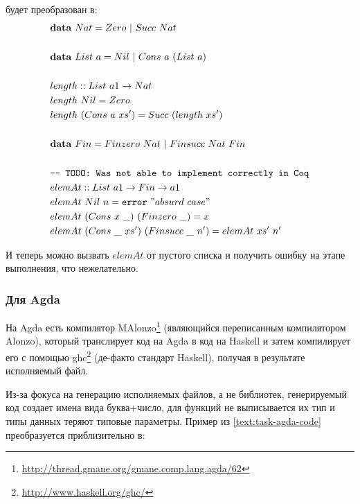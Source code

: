 будет преобразован в:
\begin{align*}
&\mathbf{data}\ Nat = Zero\ |\ Succ\ Nat\\
\\
&\mathbf{data}\ List\ a = Nil\ |\ Cons\ a\ (List\ a)\\
\\
&length :: List\ a1 \rightarrow Nat\\
&length\ Nil = Zero\\
&length\ (Cons\ a\ xs') = Succ\ (length\ xs')\\
\\
&\mathbf{data}\ Fin = Finzero\ Nat\ |\ Finsucc\ Nat\ Fin\\
\\
&\texttt{--- TODO: Was not able to implement correctly in Coq}\\
&elemAt :: List\ a1 \rightarrow Fin \rightarrow a1\\
&elemAt\ Nil\ n = \texttt{error}\ "absurd\ case"\\
&elemAt\ (Cons\ x\ \_)\ (Finzero\ \_) = x\\
&elemAt\ (Cons\ \_\ xs')\ (Finsucc\ \_\ n') = elemAt\ xs'\ n'
\end{align*}

И теперь можно вызвать \(elemAt\) от пустого списка и получить ошибку на
этапе выполнения, что нежелательно.

\subsubsection{Для Agda}

На Agda есть компилятор
MAlonzo\footnote{\url{http://thread.gmane.org/gmane.comp.lang.agda/62}}
(являющийся переписанным компилятором Alonzo\cite{Ben07}), который транслирует
код на Agda в код на Haskell и затем компилирует его с помощью
ghc\footnote{\url{http://www.haskell.org/ghc/}} (де-факто стандарт Haskell),
получая в результате исполняемый файл.

Из-за фокуса на генерацию исполняемых файлов, а не библиотек,
генерируемый код создает имена вида буква+число, для функций
не выписывается их тип и типы данных теряют типовые параметры.
Пример из \ref{text:task-agda-code} преобразуется приблизительно в:

